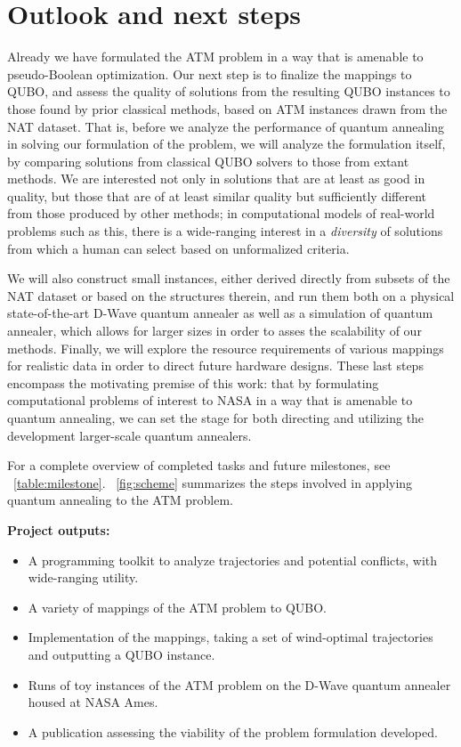\section*{Outlook and next steps}\label{sec:ass}

Already we have formulated the ATM problem in a way that is amenable to pseudo-Boolean optimization.
Our next step is to finalize the mappings to QUBO, and assess the quality of solutions from the resulting QUBO instances to those found by prior classical methods, based on ATM instances drawn from the NAT dataset.
That is, before we analyze the performance of quantum annealing in solving our formulation of the problem, we will analyze the formulation itself, by comparing solutions from classical QUBO solvers to those from extant methods.
We are interested not only in solutions that are at least as good in quality, but those that are of at least similar quality but sufficiently different from those produced by other methods; in computational models of real-world problems such as this, there is a wide-ranging interest in a \emph{diversity} of solutions from which a human can select based on unformalized criteria.

We will also construct small instances, either derived directly from subsets of the NAT dataset or based on the structures therein, and run them both on a physical state-of-the-art D-Wave quantum annealer as well as a simulation of quantum annealer, which allows for larger sizes in order to asses the scalability of our methods.
Finally, we will explore the resource requirements of various mappings for realistic data in order to direct future hardware designs.
These last steps encompass the motivating premise of this work: that by formulating computational problems of interest to NASA in a way that is amenable to quantum annealing, we can set the stage for both directing and utilizing the development larger-scale quantum annealers.

For a complete overview of completed tasks and future milestones, see \tablename~\ref{table:milestone}.
\figurename~\ref{fig:scheme} summarizes the steps involved in applying quantum annealing to the ATM problem.

\noindent
\textbf{Project outputs:}
\begin{itemize}
  \item A programming toolkit to analyze trajectories and potential conflicts, with wide-ranging utility.
  \item A variety of mappings of the ATM problem to QUBO.
  \item Implementation of the mappings, taking a set of wind-optimal trajectories and outputting a QUBO instance.
  \item Runs of toy instances of the ATM problem on the D-Wave quantum annealer housed at NASA Ames.
  \item A publication assessing the viability of the problem formulation developed.
\end{itemize}



